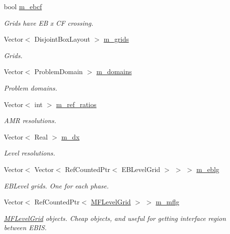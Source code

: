 \begin{DoxyCompactItemize}
bool \hyperlink{classamr__mesh_ac6108679b364b7e411ca709e1d8dfac9}{m\+\_\+ebcf}
\begin{DoxyCompactList}\small\item\em Grids have EB x CF crossing. \end{DoxyCompactList}\item 
Vector$<$ Disjoint\+Box\+Layout $>$ \hyperlink{classamr__mesh_a40f1252cc2314c8ddb16d94ce024adce}{m\+\_\+grids}
\begin{DoxyCompactList}\small\item\em Grids. \end{DoxyCompactList}\item 
Vector$<$ Problem\+Domain $>$ \hyperlink{classamr__mesh_a3eccd618a9a75f8eb824f38872a1b315}{m\+\_\+domains}
\begin{DoxyCompactList}\small\item\em Problem domains. \end{DoxyCompactList}\item 
Vector$<$ int $>$ \hyperlink{classamr__mesh_aa31efb6fc699acef8826555989ea803c}{m\+\_\+ref\+\_\+ratios}
\begin{DoxyCompactList}\small\item\em A\+MR resolutions. \end{DoxyCompactList}\item 
Vector$<$ Real $>$ \hyperlink{classamr__mesh_ab361e5fb07b7049a1fc612bd2ceb8705}{m\+\_\+dx}
\begin{DoxyCompactList}\small\item\em Level resolutions. \end{DoxyCompactList}\item 
Vector$<$ Vector$<$ Ref\+Counted\+Ptr$<$ E\+B\+Level\+Grid $>$ $>$ $>$ \hyperlink{classamr__mesh_a852e94a4c9a5c9970a9bf5777e5cc3de}{m\+\_\+eblg}
\begin{DoxyCompactList}\small\item\em E\+B\+Level grids. One for each phase. \end{DoxyCompactList}\item 
Vector$<$ Ref\+Counted\+Ptr$<$ \hyperlink{classMFLevelGrid}{M\+F\+Level\+Grid} $>$ $>$ \hyperlink{classamr__mesh_a97c0a341d220e43511ef57b97153dd0a}{m\+\_\+mflg}
\begin{DoxyCompactList}\small\item\em \hyperlink{classMFLevelGrid}{M\+F\+Level\+Grid} objects. Cheap objects, and useful for getting interface region between E\+B\+IS\textquotesingle{}. \end{DoxyCompactList}\item 

\end{DoxyCompactItemize}
